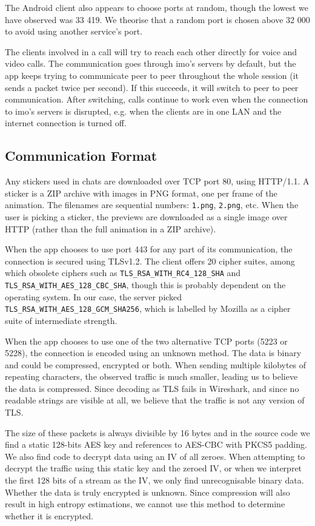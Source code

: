 \documentclass[conference]{IEEEtran}
\begin{document}
The Android client also appears to choose ports at random, though the lowest we
have observed was 33 419. We theorise that a random port is chosen above 32 000
to avoid using another service's port.

The clients involved in a call will try to reach each other directly for voice
and video calls. The communication goes through imo's servers by default, but
the app keeps trying to communicate peer to peer throughout the whole session
(it sends a packet twice per second). If this succeeds, it will switch to peer
to peer communication. After switching, calls continue to work even when the
connection to imo's servers is disrupted, e.g. when the clients are in one LAN
and the internet connection is turned off.


\subsection{Communication Format}

Any stickers used in chats are downloaded over TCP port 80, using HTTP/1.1. A
sticker is a ZIP archive with images in PNG format, one per frame of the
animation. The filenames are sequential numbers: \texttt{1.png},
\texttt{2.png}, etc. When the user is picking a sticker, the previews are
downloaded as a single image over HTTP (rather than the full animation in a ZIP
archive).

When the app chooses to use port 443 for any part of its communication, the
connection is secured using TLSv1.2. The client offers 20 cipher suites, among
which obsolete ciphers such as \texttt{TLS\_RSA\_WITH\_RC4\_128\_SHA} and
\texttt{TLS\_RSA\_WITH\_AES\_128\_CBC\_SHA}, though this is probably dependent
on the operating system. In our case, the server picked
\texttt{TLS\_RSA\_WITH\_AES\_128\_GCM\_SHA256}, which is labelled by Mozilla as
a cipher suite of intermediate strength\cite{moz-tls}.

When the app chooses to use one of the two alternative TCP ports (5223 or
5228), the connection is encoded using an unknown method. The data is binary
and could be compressed, encrypted or both. When sending multiple kilobytes of
repeating characters, the observed traffic is much smaller, leading us to
believe the data is compressed. Since decoding as TLS fails in Wireshark, and
since no readable strings are visible at all, we believe that the traffic is
not any version of TLS.

The size of these packets is always divisible by 16 bytes and in the source
code we find a static 128-bits AES key and references to AES-CBC with PKCS5
padding. We also find code to decrypt data using an IV of all zeroes. When
attempting to decrypt the traffic using this static key and the zeroed IV, or
when we interpret the first 128 bits of a stream as the IV, we only find
unrecognisable binary data. Whether the data is truly encrypted is unknown.
Since compression will also result in high entropy estimations, we cannot use
this method to determine whether it is encrypted.
\end{document}
